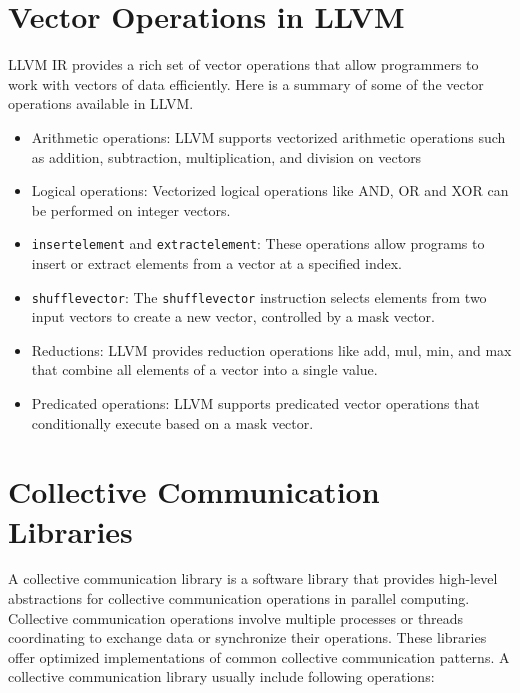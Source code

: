 \section {Vector Operations in LLVM}
\label{sec:llvm-vector-ops}

LLVM IR provides a rich set of vector operations that allow
programmers to work with vectors of data efficiently. Here is a
summary of some of the vector operations available in LLVM.

\begin{itemize}
  \item Arithmetic operations: LLVM supports vectorized arithmetic
  operations such as addition, subtraction, multiplication, and
  division on vectors
  \item Logical operations: Vectorized logical operations like AND, OR
  and XOR can be performed on integer vectors.
  \item \texttt{insertelement} and \texttt{extractelement}: These
  operations allow programs to insert or extract elements from a
  vector at a specified index.
  \item \texttt{shufflevector}: The \texttt{shufflevector} instruction
  selects elements from two input vectors to create a new vector,
  controlled by a mask vector.
  \item Reductions: LLVM provides reduction operations like add, mul,
  min, and max that combine all elements of a vector into a single
  value.
  \item Predicated operations: LLVM supports predicated vector
  operations that conditionally execute based on a mask vector.
\end{itemize}




\section {Collective Communication Libraries}

A collective communication library is a software library that provides
high-level abstractions for collective communication operations in
parallel computing. Collective communication operations involve
multiple processes or threads coordinating to exchange data or
synchronize their operations. These libraries offer optimized
implementations of common collective communication patterns.
A collective communication library usually include following operations:

